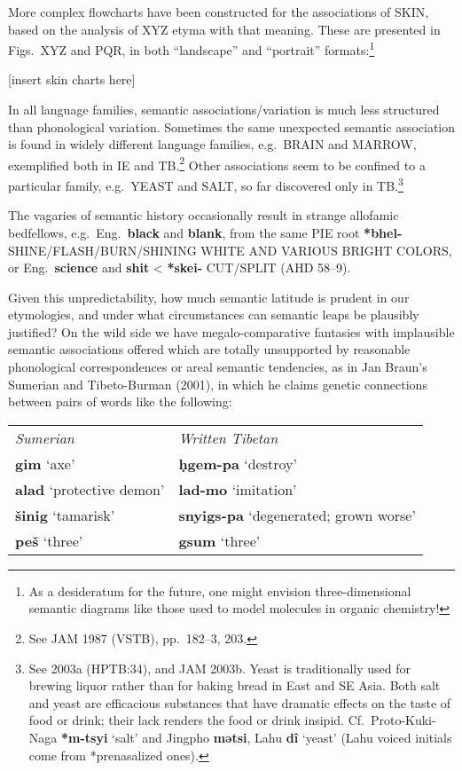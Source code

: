 More complex flowcharts have been constructed for the associations of SKIN, based on the analysis of XYZ etyma with that meaning. These are presented in Figs.~XYZ and PQR, in both “landscape” and “portrait” formats:\footnote{As a desideratum for the future, one might envision three-dimensional semantic diagrams like those used to model molecules in organic chemistry!}

[insert skin charts here]

In all language families, semantic associations/variation is much less structured than phonological variation. Sometimes the same unexpected semantic association is found in widely different language families, e.g.\ BRAIN and MARROW, exemplified both in IE and TB.\footnote{See JAM 1987 (VSTB), pp.~182–3, 203.} Other associations seem to be confined to a particular family, e.g.\ YEAST and SALT, so far discovered only in TB.\footnote{See 2003a (HPTB:34), and JAM 2003b. Yeast is traditionally used for brewing liquor rather than for baking bread in East and SE Asia. Both salt and yeast are efficacious substances that have dramatic effects on the taste of food or drink; their lack renders the food or drink insipid. Cf.\ Proto-Kuki-Naga \textbf{*m-tsyi} ‘salt’ and Jingpho \textbf{mətsi}, Lahu \textbf{dî} ‘yeast’ (Lahu voiced initials come from *prenasalized ones).}

The vagaries of semantic history occasionally result in strange allofamic bedfellows, e.g.\ Eng.\ \textbf{black} and \textbf{blank}, from the same PIE root \textbf{*bhel-} SHINE/FLASH/BURN/SHINING WHITE AND VARIOUS BRIGHT COLORS, or Eng.\ \textbf{science} and \textbf{shit} < \textbf{*skei-} CUT/SPLIT (AHD 58–9).

Given this unpredictability, how much semantic latitude is prudent in
our etymologies, and under what circumstances can semantic leaps be
plausibly justified? On the wild side we have megalo-comparative
fantasies with implausible semantic associations offered which are
totally unsupported by reasonable phonological correspondences or
areal semantic tendencies, as in Jan Braun’s Sumerian and
Tibeto-Burman (2001), in which he claims genetic connections between
pairs of words like the following:

\begin{tabular}{l l}
		\textit{Sumerian}		&		\textit{Written Tibetan}\\
		\textbf{gim} ‘axe’		&		\textbf{ḥgem-pa} ‘destroy’\\
		\textbf{alad} ‘protective demon’	&	\textbf{lad-mo} ‘imitation’\\
		\textbf{šinig} ‘tamarisk’	&		\textbf{snyigs-pa} ‘degenerated; grown worse’\\
		\textbf{peš} ‘three’	&		\textbf{gsum} ‘three’\\
\end{tabular}

